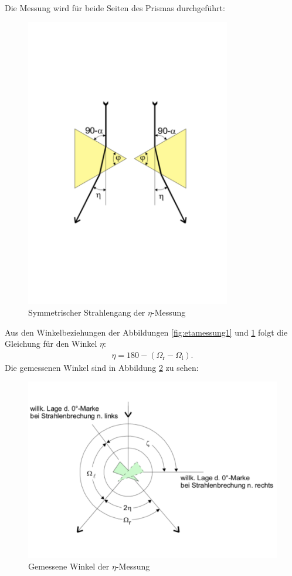 Die Messung wird für beide Seiten des Prismas durchgeführt:
\begin{figure}[h!]
  \centering
  \includegraphics[width=0.8\textwidth]{etamessung2.pdf}
  \caption{Symmetrischer Strahlengang der $\eta$-Messung \cite{1}}
  \label{fig:etamessung2}
\end{figure}
Aus den Winkelbeziehungen der Abbildungen \ref{fig:etamessung1} und \ref{fig:etamessung2} folgt die Gleichung für den Winkel $\eta$:
\begin{align}
  \eta= 180 - (\Omega_{\text{r}} - \Omega_{\text{l}}).
\end{align}
Die gemessenen Winkel sind in Abbildung \ref{fig:etamessung3} zu sehen:
\begin{figure}[h!]
  \centering
  \includegraphics[width=\textwidth]{etamessung3.pdf}
  \caption{Gemessene Winkel der $\eta$-Messung \cite{1}}
  \label{fig:etamessung3}
\end{figure}

